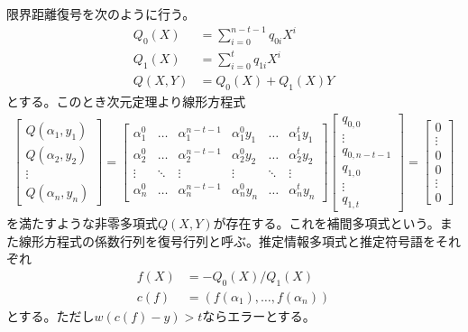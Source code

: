 \documentclass{jsarticle}
\renewcommand{\(}{\left(}
\renewcommand{\)}{\right)}
\theoremstyle{definition}
\begin{document}
限界距離復号を次のように行う。
\begin{align*}
    Q_0(X) &= \sum_{i=0}^{n-t-1} q_{0i}X^i\\
    Q_1(X) &= \sum_{i=0}^t q_{1i}X^i\\
    Q(X, Y) &= Q_0(X) + Q_1(X)Y
\end{align*}
とする。このとき次元定理より線形方程式
\begin{align*}
    \begin{bmatrix}
        Q(\alpha_1, y_1)\\
        Q(\alpha_2, y_2)\\
        \vdots\\
        Q(\alpha_n, y_n)
    \end{bmatrix}
    =
    \begin{bmatrix}
        \alpha_1^0 & \dots & \alpha_1^{n-t-1} & \alpha_1^0y_1 & \dots & \alpha_1^ty_1\\
        \alpha_2^0 & \dots & \alpha_2^{n-t-1} & \alpha_2^0y_2 & \dots & \alpha_2^ty_2\\
        \vdots & \ddots & \vdots & \vdots & \ddots & \vdots\\
        \alpha_n^0 & \dots & \alpha_n^{n-t-1} & \alpha_n^0y_n & \dots & \alpha_n^ty_n
    \end{bmatrix}
    \begin{bmatrix}
        q_{0, 0}\\
        \vdots\\
        q_{0, n-t-1}\\
        q_{1, 0}\\
        \vdots\\
        q_{1, t}
    \end{bmatrix}
    =
    \begin{bmatrix}
        0\\
        \vdots\\
        0\\
        0\\
        \vdots\\
        0
    \end{bmatrix}
\end{align*}
を満たすような非零多項式$Q(X, Y)$が存在する。これを補間多項式という。また線形方程式の係数行列を復号行列と呼ぶ。推定情報多項式と推定符号語をそれぞれ
\begin{align*}
    f(X) &= -Q_0(X) / Q_1(X)\\
    c(f) &= (f(\alpha_1), \dots, f(\alpha_n))
\end{align*}
とする。ただし$w(c(f) - y) > t$ならエラーとする。
\end{document}
